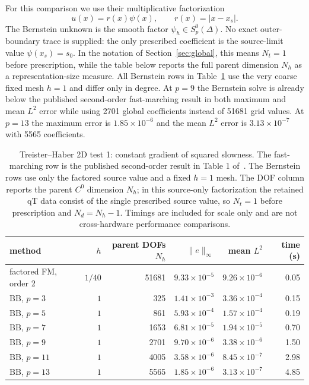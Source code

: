 \documentclass[preprint,12pt]{elsarticle}
\begin{document}
For this comparison we use their multiplicative factorization
\[
 u(x)=r(x)\psi(x),\qquad r(x)=|x-x_s|.
\]
The Bernstein unknown is the smooth factor $\psi_h\in S_p^0(\Delta)$.  No exact outer-boundary trace is supplied: the only prescribed coefficient is the source-limit value $\psi(x_s)=s_0$.  In the notation of Section~\ref{sec:global}, this means $N_t=1$ before prescription, while the table below reports the full parent dimension $N_h$ as a representation-size measure.  All Bernstein rows in Table~\ref{tab:THcompare} use the very coarse fixed mesh $h=1$ and differ only in degree.  At $p=9$ the Bernstein solve is already below the published second-order fast-marching result in both maximum and mean $L^2$ error while using 2701 global coefficients instead of 51681 grid values.  At $p=13$ the maximum error is $1.85\times10^{-6}$ and the mean $L^2$ error is $3.13\times10^{-7}$ with 5565 coefficients.

\begin{table}[t]
\centering
\small
\caption{Treister--Haber 2D test 1: constant gradient of squared slowness.  The fast-marching row is the published second-order result in Table 1 of~\cite{TreisterHaber2016}.  The Bernstein rows use only the factored source value and a fixed $h=1$ mesh.  The DOF column reports the parent $C^0$ dimension $N_h$; in this source-only factorization the retained qT data consist of the single prescribed source value, so $N_t=1$ before prescription and $N_d=N_h-1$.  Timings are included for scale only and are not cross-hardware performance comparisons.}
\label{tab:THcompare}
\begin{tabular}{lrrrrr}
\toprule
method & $h$ & parent DOFs $N_h$ & $\|e\|_{\infty}$ & mean $L^2$ & time (s)\\
\midrule
factored FM, order 2~\cite{TreisterHaber2016} & $1/40$ & 51681 & $9.33\times10^{-5}$ & $9.26\times10^{-6}$ & 0.05\\
BB, $p=3$  & $1$ & 325  & $1.41\times10^{-3}$ & $3.36\times10^{-4}$ & 0.15\\
BB, $p=5$  & $1$ & 861  & $5.93\times10^{-4}$ & $1.57\times10^{-4}$ & 0.19\\
BB, $p=7$  & $1$ & 1653 & $6.81\times10^{-5}$ & $1.94\times10^{-5}$ & 0.70\\
BB, $p=9$  & $1$ & 2701 & $9.70\times10^{-6}$ & $3.38\times10^{-6}$ & 1.50\\
BB, $p=11$ & $1$ & 4005 & $3.58\times10^{-6}$ & $8.45\times10^{-7}$ & 2.98\\
BB, $p=13$ & $1$ & 5565 & $1.85\times10^{-6}$ & $3.13\times10^{-7}$ & 4.85\\
\bottomrule
\end{tabular}
\end{table}
\end{document}
